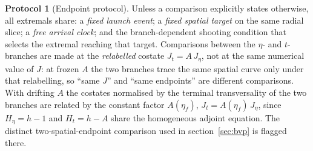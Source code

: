 \documentclass[12pt]{iopart}
\theoremstyle{plain}
\theoremstyle{definition}
\newtheorem{protocol}{Protocol}
\theoremstyle{remark}
\begin{document}
\begin{protocol}[Endpoint protocol]
\label{prot:endpoint}
Unless a comparison explicitly states otherwise, all extremals share: a
\emph{fixed launch event}; a \emph{fixed spatial target} on the same radial slice;
a \emph{free arrival clock}; and the branch-dependent shooting condition that
selects the extremal reaching that target. Comparisons between the $\eta$- and
$t$-branches are made at the \emph{relabelled} costate $J_t=A\,J_\eta$, not at the
same numerical value of $J$: at frozen $A$ the two branches trace the same spatial
curve only under that relabelling, so ``same $J$'' and ``same endpoints'' are
different comparisons. With drifting $A$ the costates normalised by the terminal
transversality of the two branches are related by the constant factor $A(\eta_f)$,
$J_t=A(\eta_f)\,J_\eta$, since $H_\eta=h-1$ and $H_t=h-A$ share the homogeneous adjoint
equation. The distinct two-spatial-endpoint comparison used in
section~\ref{sec:bvp} is flagged there.
\end{protocol}
\end{document}
